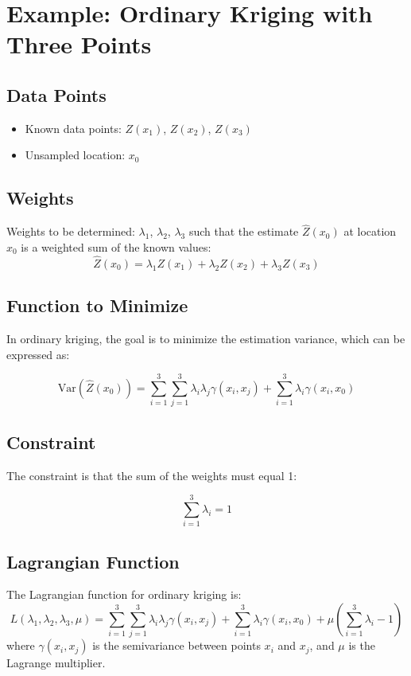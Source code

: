 \documentclass{article}
\begin{document}
\section*{Example: Ordinary Kriging with Three Points}

\subsection*{Data Points}
\begin{itemize}
    \item Known data points: \( Z(x_1) \), \( Z(x_2) \), \( Z(x_3) \)
    \item Unsampled location: \( x_0 \)
\end{itemize}

\subsection*{Weights}
Weights to be determined: \( \lambda_1 \), \( \lambda_2 \), \( \lambda_3 \) such that the estimate \( \hat{Z}(x_0) \) at location \( x_0 \) is a weighted sum of the known values:
   $$
   \hat{Z}(x_0) = \lambda_1 Z(x_1) + \lambda_2 Z(x_2) + \lambda_3 Z(x_3)
   $$

\subsection*{Function to Minimize}

In ordinary kriging, the goal is to minimize the estimation variance, which can be expressed as:

$$
\text{Var}(\hat{Z}(x_0)) = \sum_{i=1}^{3} \sum_{j=1}^{3} \lambda_i \lambda_j \gamma(x_i, x_j) + \sum_{i=1}^{3} \lambda_i \gamma(x_i, x_0)
$$

\subsection*{Constraint}

The constraint is that the sum of the weights must equal 1:

$$
\sum_{i=1}^{3} \lambda_i = 1
$$


\subsection*{Lagrangian Function}
The Lagrangian function for ordinary kriging is:
\[
L(\lambda_1, \lambda_2, \lambda_3, \mu) = \sum_{i=1}^{3} \sum_{j=1}^{3} \lambda_i \lambda_j \gamma(x_i, x_j) + \sum_{i=1}^{3} \lambda_i \gamma(x_i, x_0) + \mu \left( \sum_{i=1}^{3} \lambda_i - 1 \right)
\]
where \( \gamma(x_i, x_j) \) is the semivariance between points \( x_i \) and \( x_j \), and \( \mu \) is the Lagrange multiplier.
\end{document}
